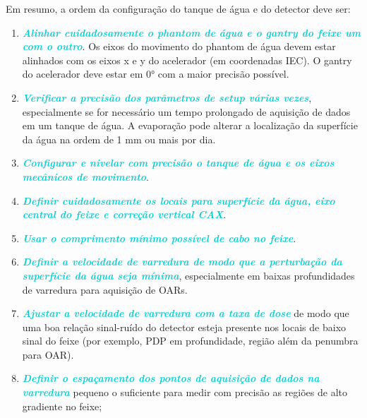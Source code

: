 \documentclass[11pt,a4paper]{article}
\newcounter{exemplo}
\begin{document}
	Em resumo, a ordem da configuração do tanque de água e do detector deve ser:

	\begin{enumerate}[label=\textcolor{CarnationPink}{\arabic*${}^\circ $}]
		\item \textcolor{DarkTurquoise}{\textbf{\textit{Alinhar cuidadosamente o phantom de água e o gantry do feixe um com o outro}}}. Os eixos do movimento do phantom de água devem estar alinhados com os eixos x e y do acelerador (em coordenadas IEC). O gantry do acelerador deve estar em \ang{0} com a maior precisão possível.
		
		\item \textcolor{DarkTurquoise}{\textbf{\textit{Verificar a precisão dos parâmetros de setup várias vezes}}}, especialmente se for necessário um tempo prolongado de aquisição de dados em um tanque de água. A evaporação pode alterar a localização da superfície da água na ordem de 1 mm ou mais por dia.
		
		\item \textcolor{DarkTurquoise}{\textbf{\textit{Configurar e nivelar com precisão o tanque de água e os eixos mecânicos de movimento}}}.
		
		\item \textcolor{DarkTurquoise}{\textbf{\textit{Definir cuidadosamente os locais para superfície da água, eixo central do feixe e correção vertical CAX}}}.
		
		\item \textcolor{DarkTurquoise}{\textbf{\textit{Usar o comprimento mínimo possível de cabo no feixe}}}.
		
		\item \textcolor{DarkTurquoise}{\textbf{\textit{Definir a velocidade de varredura de modo que a perturbação da superfície da água seja mínima}}}, especialmente em baixas profundidades de varredura para aquisição de OARs.
		
		\item \textcolor{DarkTurquoise}{\textbf{\textit{Ajustar a velocidade de varredura com a taxa de dose}}} de modo que uma boa relação sinal-ruído do detector esteja presente nos locais de baixo sinal do feixe (por exemplo, PDP em profundidade, região além da penumbra para OAR).
		
		\item \textcolor{DarkTurquoise}{\textbf{\textit{Definir o espaçamento dos pontos de aquisição de dados na varredura}}} pequeno o suficiente para medir com precisão as regiões de alto gradiente no feixe;
	\end{enumerate}
\end{document}

